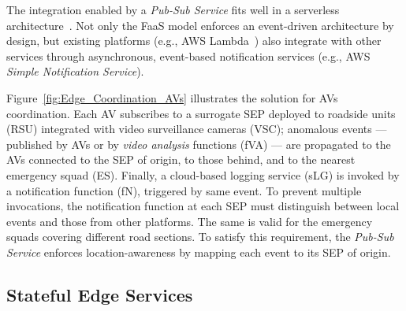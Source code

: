 The integration enabled by a \textit{Pub-Sub Service} fits well in a serverless architecture~\cite{Lloyd18serverless}. Not only the FaaS model enforces an event-driven architecture by design, but existing platforms (e.g., AWS Lambda~\cite{AWSLambda}) also integrate with other services through asynchronous, event-based notification services (e.g., AWS \textit{Simple Notification Service}). 



Figure~\ref{fig:Edge_Coordination_AVs} illustrates the solution for AVs coordination. Each AV subscribes to a surrogate SEP deployed to roadside units (RSU) integrated with video surveillance cameras (VSC); anomalous events --- published by AVs or by \textit{video analysis} functions (fVA) --- are propagated to the AVs connected to the SEP of origin, to those behind, and to the nearest emergency squad (ES). Finally, a cloud-based logging service (sLG) is invoked by a notification function (fN), triggered by same event. To prevent multiple invocations, the notification function at each SEP must distinguish between local events and those from other platforms. The same is valid for the emergency squads covering different road sections. To satisfy this requirement, the \textit{Pub-Sub Service} enforces location-awareness by mapping each event to its SEP of origin.

\subsection{Stateful Edge Services}

